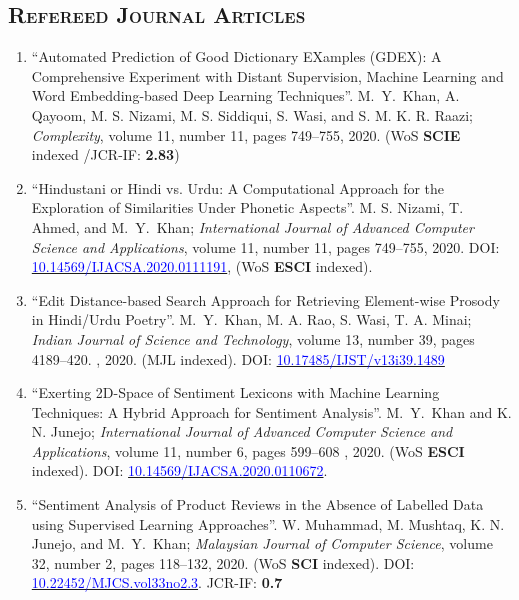 \documentclass[a4paper, 10pt]{article}
\begin{document}
\subsection*{\normalfont\textsc{ Refereed Journal Articles}}
\begin{enumerate}
\itemsep-4pt 

	\item ``Automated Prediction of Good Dictionary EXamples (GDEX): A Comprehensive Experiment with Distant Supervision, Machine Learning and Word Embedding-based Deep Learning Techniques''. \textcolor{NavyBlue}{M.~Y.~Khan}, A. Qayoom, M. S. Nizami, M. S. Siddiqui, S. Wasi, and S. M. K. R. Raazi; \emph{Complexity}, volume 11, number 11, pages  749--755, 2020. %
(WoS {\bfseries SCIE} indexed /JCR-IF: {\bfseries 2.83})
	
	\item ``Hindustani or Hindi vs. Urdu: A Computational Approach for the Exploration of Similarities Under Phonetic Aspects''. M. S. Nizami, T. Ahmed, and \textcolor{NavyBlue}{M.~Y.~Khan}; \emph{International Journal of Advanced Computer Science and Applications}, volume 11, number 11, pages  749--755, 2020. DOI: \href{https://dx.doi.org/10.14569/IJACSA.2020.0111191}{\textcolor{blue}{10.14569/IJACSA.2020.0111191}}, (WoS {\bfseries ESCI} indexed).
	
	\item ``Edit Distance-based Search Approach for Retrieving  Element-wise Prosody in Hindi/Urdu Poetry''. \textcolor{NavyBlue}{M.~Y.~Khan}, M. A. Rao, S. Wasi, T. A. Minai; \emph{Indian Journal of Science and Technology}, volume 13, number 39, pages  4189--420.
, 2020. (MJL indexed). DOI: \href{https://doi.org/10.17485/IJST/v13i39.1489}{\textcolor{blue}{10.17485/IJST/v13i39.1489}}

	\item ``Exerting 2D-Space of Sentiment Lexicons with Machine Learning Techniques: A Hybrid Approach for Sentiment Analysis''. \textcolor{NavyBlue}{M.~Y.~Khan} and K. N. Junejo; \emph{International Journal of Advanced Computer Science and Applications}, volume 11, number 6, pages 599--608
, 2020. (WoS {\bfseries ESCI} indexed). DOI: \href{https://doi.org/10.14569/IJACSA.2020.0110672}{\textcolor{blue}{10.14569/IJACSA.2020.0110672}}.
       
    \item ``Sentiment Analysis of Product Reviews in the Absence of Labelled Data using Supervised Learning Approaches''. W. Muhammad, M. Mushtaq, K. N. Junejo, and \textcolor{NavyBlue}{M.~Y.~Khan}; \emph{Malaysian Journal of Computer Science}, volume 32, number 2, pages 118--132, 2020. (WoS {\bfseries SCI} indexed). DOI: \href{https://doi.org/10.22452/mjcs.vol33no2.3}{\textcolor{blue}{10.22452/MJCS.vol33no2.3}}. JCR-IF: {\bfseries 0.7}
    

\end{enumerate}
\end{document}
